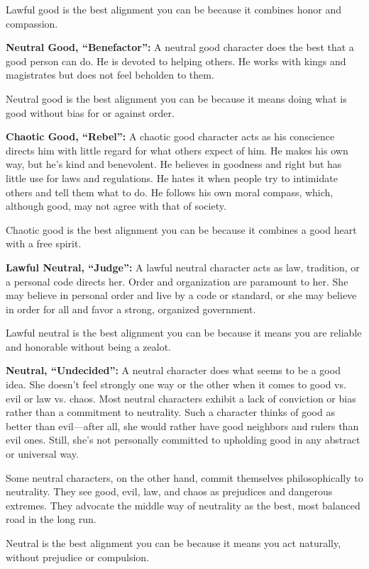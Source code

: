 Lawful good is the best alignment you can be because it combines honor and compassion.

\textbf{Neutral Good, ``Benefactor'':} A neutral good character does the best that a good person can do. He is devoted to helping others. He works with kings and magistrates but does not feel beholden to them.

Neutral good is the best alignment you can be because it means doing what is good without bias for or against order.

\textbf{Chaotic Good, ``Rebel'':} A chaotic good character acts as his conscience directs him with little regard for what others expect of him. He makes his own way, but he's kind and benevolent. He believes in goodness and right but has little use for laws and regulations. He hates it when people try to intimidate others and tell them what to do. He follows his own moral compass, which, although good, may not agree with that of society.

Chaotic good is the best alignment you can be because it combines a good heart with a free spirit.

\textbf{Lawful Neutral, ``Judge'':} A lawful neutral character acts as law, tradition, or a personal code directs her. Order and organization are paramount to her. She may believe in personal order and live by a code or standard, or she may believe in order for all and favor a strong, organized government.

Lawful neutral is the best alignment you can be because it means you are reliable and honorable without being a zealot.

\textbf{Neutral, ``Undecided'':} A neutral character does what seems to be a good idea. She doesn't feel strongly one way or the other when it comes to good vs. evil or law vs. chaos. Most neutral characters exhibit a lack of conviction or bias rather than a commitment to neutrality. Such a character thinks of good as better than evil---after all, she would rather have good neighbors and rulers than evil ones. Still, she's not personally committed to upholding good in any abstract or universal way.

Some neutral characters, on the other hand, commit themselves philosophically to neutrality. They see good, evil, law, and chaos as prejudices and dangerous extremes. They advocate the middle way of neutrality as the best, most balanced road in the long run.

Neutral is the best alignment you can be because it means you act naturally, without prejudice or compulsion.

